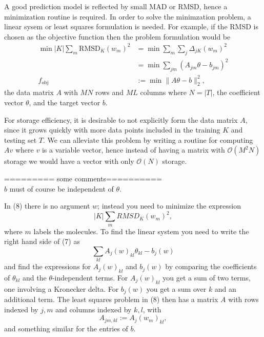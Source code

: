 \documentclass[12pt]{article}
\begin{document}
A good prediction model is reflected by small MAD or RMSD, hence a minimization routine is required. In order to solve the minimzation problem, a linear sysem or least squares formulation is needed. For example, if the RMSD is chosen as the objective function then the problem formulation would be
\begin{equation}
    \label{eq:min}
    \begin{split}
        \min |K| \sum_m \text{RMSD}_K(w_m)^2 &= \min \sum_m \sum_j \Delta_{jK}(w_m)^2 \\
        &= \min \sum_{jm} \left( A_{jm}\theta - b_{jm}\right)^2 \\
        f_{\text{obj}} &:= \min \|A \theta - b\|_2^2,
    \end{split}
\end{equation}
the data matrix $A$ with $MN$ rows and $ML$ columns where $N = |T|$, the coefficient vector $\theta$, and the target vector $b$.

For storage efficiency, it is desirable to not explicitly form the data matrix $A$, since it grows quickly with more data points included in the training $K$ and testing set $T$. We can alleviate this problem by writing a routine for computing $Av$ where $v$ is a variable vector, hence instead of having a matrix with $\mathcal{O}(M^2N)$ storage we would have a vector with only $\mathcal{O}(N)$ storage.


\iffalse
========= some comments========== \\
$b$ must of course be independent of $\theta$.

In (8) there is no argument $w$; instead you need to minimize the expression
\begin{equation}
    |K| \sum_m RMSD_K(w_m)^2,
\end{equation}
where $m$ labels the molecules. To find the linear system you need to write the right hand side of (7) as
\begin{equation}
    \sum_{kl} A_j(w)_{kl} \theta_{kl} -b_j(w)
\end{equation}
and find the expressions for $A_j(w)_{kl}$ and $b_j(w)$ by comparing the coefficients of $\theta_{kl}$ and the $\theta$-independent terms. For $A_j(w)_{kl}$ you get a sum of two terms, one involving a Kronecker delta. For $b_j(w)$ you get a sum over $k$ and an additional term.
The least squares problem in (8) then has a matrix $A$ with rows indexed by $j,m$ and columns indexed by $k,l$, with
\begin{equation}
    A_{jm,kl}:=A_j(w_m)_{kl},
\end{equation}
and something similar for the entries of $b$.
\end{document}
